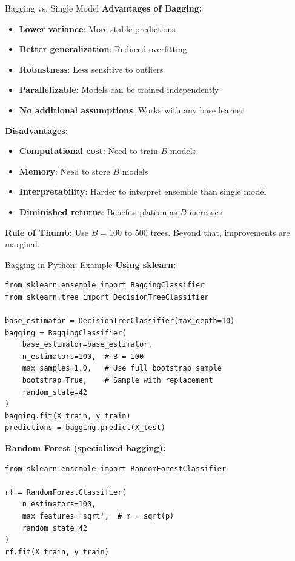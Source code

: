 \documentclass[aspectratio=169]{beamer}
\begin{document}
\begin{frame}{Bagging vs. Single Model}
\scriptsize
\textbf{Advantages of Bagging:}
\begin{itemize}
    \item \textbf{Lower variance}: More stable predictions
    \item \textbf{Better generalization}: Reduced overfitting
    \item \textbf{Robustness}: Less sensitive to outliers
    \item \textbf{Parallelizable}: Models can be trained independently
    \item \textbf{No additional assumptions}: Works with any base learner
\end{itemize}

\vspace{0.1cm}
\textbf{Disadvantages:}
\begin{itemize}
    \item \textbf{Computational cost}: Need to train $B$ models
    \item \textbf{Memory}: Need to store $B$ models
    \item \textbf{Interpretability}: Harder to interpret ensemble than single model
    \item \textbf{Diminished returns}: Benefits plateau as $B$ increases
\end{itemize}

\vspace{0.05cm}
\textbf{Rule of Thumb:} Use $B = 100$ to $500$ trees. Beyond that, improvements are marginal.
\end{frame}

\begin{frame}[fragile]{Bagging in Python: Example}
\tiny
\textbf{Using sklearn:}
\begin{lstlisting}[basicstyle=\tiny]
from sklearn.ensemble import BaggingClassifier
from sklearn.tree import DecisionTreeClassifier

base_estimator = DecisionTreeClassifier(max_depth=10)
bagging = BaggingClassifier(
    base_estimator=base_estimator,
    n_estimators=100,  # B = 100
    max_samples=1.0,   # Use full bootstrap sample
    bootstrap=True,    # Sample with replacement
    random_state=42
)
bagging.fit(X_train, y_train)
predictions = bagging.predict(X_test)
\end{lstlisting}

\vspace{0.03cm}
\textbf{Random Forest (specialized bagging):}
\begin{lstlisting}[basicstyle=\tiny]
from sklearn.ensemble import RandomForestClassifier

rf = RandomForestClassifier(
    n_estimators=100,
    max_features='sqrt',  # m = sqrt(p)
    random_state=42
)
rf.fit(X_train, y_train)
\end{lstlisting}
\end{frame}
\end{document}
